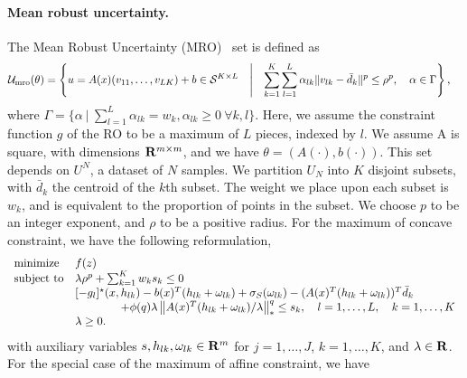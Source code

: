 \documentclass[11pt]{article}
\newcommand{\bsnote}[1]{\noindent\textcolor{red}{\texttt{Bartolomeo: #1}}}
\newcommand{\RC}[1]{\textcolor{black}{#1}}
\begin{document}
\begin{appendices}
\paragraph{Mean robust uncertainty.}
The Mean Robust Uncertainty (MRO)~\citep{mro} set
is defined as
\begin{equation*}
	\begin{aligned}
		\uncset_{\text{mro}}(\theta) & = \left\{ u = A\RC{(x)}(v_{11},\dots,v_{LK})+ b\in \supp^{K\times L} \quad\middle|\quad \sum_{k=1}^K \sum_{l=1}^L \alpha_{lk} \| v_{lk} - \bar{d}_k \|^p \le \rho^p,\quad \alpha \in \Gamma \right\},
	\end{aligned}
\end{equation*}
where $\Gamma = \{\alpha~|~\sum_{l=1}^L\alpha_{lk}= w_k, \alpha_{lk}\geq 0 ~\forall k,l\}$. 
Here, we assume the constraint function $g$ of the \gls{RO} to be a maximum of $L$ pieces, indexed by $l$. 
We assume A is square, with dimensions ${\mathbf R}^{m\times m}$, and we have $\theta = (A(\cdot), b(\cdot))$. 
This set depends on $U^N$, a dataset of $N$ samples.
We partition ${U}_N$ into $K$ disjoint subsets, with $\bar{d}_k$ the centroid of the $k$th subset. The weight we place upon each subset is $w_k$, and is equivalent to the proportion of points in the subset. We choose $p$ to be an integer exponent, and $\rho$ to be a positive radius. 
For the maximum of concave constraint, we have the following reformulation,
\begin{equation*}
	\begin{aligned}
	\begin{array}{ll}
	{\text{minimize}} & f(z)\\
	\mbox{subject to} &\lambda \rho^p + \sum_{k=1}^K w_k s_k \leq 0\\
	 & [-g_l]^\star(x,h_{lk}) -b\RC{(x)}^T(h_{lk} + \omega_{lk}) + \sigma_S(\omega_{lk}) - (A\RC{(x)}^T(h_{lk} + \omega_{lk}))^T \bar{d}_k \\
& \qquad \qquad + \phi(q)\lambda \left\|A\RC{(x)}^T(h_{lk} + \omega_{lk})/\lambda \right\|^q_* \le s_k,\quad  l = 1,\dots,L, \quad k = 1,\dots,K\\
& \lambda \geq 0.
	\end{array}
	\end{aligned}
	\end{equation*}
with auxiliary variables  $s, h_{lk}, \omega_{lk} \in {\mathbf R}^m$ for $j = 1,\dots,J$, $k = 1,\dots, K$, and $\lambda \in {\mathbf R}$. For the special case of the maximum of affine constraint, we have

\end{appendices}
\end{document}
